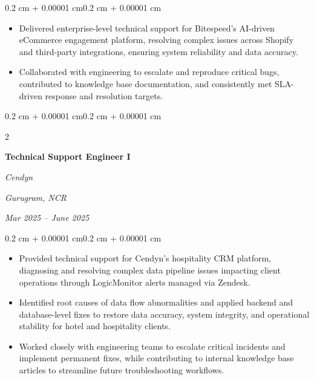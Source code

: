 \documentclass[10pt, letterpaper]{article}
\newenvironment{highlights}{
    \begin{itemize}[
        topsep=0.10 cm,
        parsep=0.10 cm,
        partopsep=0pt,
        itemsep=0pt,
        leftmargin=0.4 cm + 10pt
    ]
}{
    \end{itemize}
}
\newenvironment{onecolentry}{
    \begin{adjustwidth}{0.2 cm + 0.00001 cm}{0.2 cm + 0.00001 cm}
}{
    \end{adjustwidth}
}
\newenvironment{twocolentry}[2][]{
    \onecolentry
    \def\secondColumn{#2}
    \setcolumnwidth{\fill, 4.5 cm}
    \begin{paracol}{2}
}{
    \switchcolumn \raggedleft \secondColumn
    \end{paracol}
    \endonecolentry
}
\begin{document}
    \vspace{0.10 cm}
    \begin{onecolentry}
        \begin{highlights}
            \item Delivered enterprise-level technical support for Bitespeed's AI-driven eCommerce engagement platform, resolving complex issues across Shopify and third-party integrations, ensuring system reliability and data accuracy.
            \item Collaborated with engineering to escalate and reproduce critical bugs, contributed to knowledge base documentation, and consistently met SLA-driven response and resolution targets.
        \end{highlights}
    \end{onecolentry}

    \vspace{0.2 cm}

    \begin{twocolentry}{
        \textit{Gurugram, NCR}

        \textit{Mar 2025 -- June 2025}
    }
        \textbf{Technical Support Engineer I}

        \textit{Cendyn}
    \end{twocolentry}

    \vspace{0.10 cm}
    \begin{onecolentry}
        \begin{highlights}
            \item Provided technical support for Cendyn's hospitality CRM platform, diagnosing and resolving complex data pipeline issues impacting client operations through LogicMonitor alerts managed via Zendesk.
            \item Identified root causes of data flow abnormalities and applied backend and database-level fixes to restore data accuracy, system integrity, and operational stability for hotel and hospitality clients.
            \item Worked closely with engineering teams to escalate critical incidents and implement permanent fixes, while contributing to internal knowledge base articles to streamline future troubleshooting workflows.
        \end{highlights}
    \end{onecolentry}

    \vspace{0.2 cm}
\end{document}
